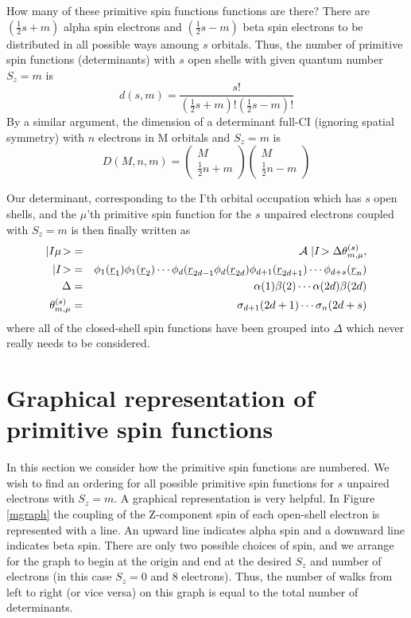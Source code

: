\documentclass[fullpage,12pt,fleqn]{article}
\newcommand{\RNold}[1]{\underline{r}_{#1}}
\newcommand{\nCr}[2]{\left(\begin{array}{c} #1 \\ #2 \end{array}\right)}
\newcommand{\half}{\frac{1}{2}}
\begin{document}
How many of these primitive spin functions functions are there?  There
are $(\half s + m)$ alpha spin electrons and $(\half s -
m)$ beta spin electrons to be distributed in all possible ways amoung
$s$ orbitals.  Thus, the number of primitive spin functions
(determinants) with $s$ open shells with given quantum number
$S_z=m$ is
\begin{equation}
d(s,m) = \frac{s!}{(\half s + m)! (\half s - m)!}
\end{equation}
By a similar argument, the dimension of a determinant full-CI
(ignoring spatial symmetry) with $n$ electrons in M orbitals and
$S_z=m$ is
\begin{equation}
D(M,n,m) = \nCr{M}{\half n + m}\nCr{M}{\half n - m}
\end{equation}

Our determinant, corresponding to the I'th orbital occupation which
has $s$ open shells, and the $\mu$'th primitive spin function for
the $s$ unpaired electrons coupled with $S_z=m$ is then finally
written as
\begin{eqnarray}
  |I\mu\! > & = & {\cal A} \; |I\! > \Delta \theta^{(s)}_{m,\mu} , \\
  |I\! > & = & \phi_{1}(\RNold{1})\phi_{1}(\RNold{2}) \cdots \phi_{d}(\RNold{2d-1}\phi_{d}(\RNold{2d})
\phi_{d+1}(\RNold{2d+1}) \cdots \phi_{d+s}(\RNold{n}) \\
  \Delta & = &\alpha(1)\beta(2) \cdots \alpha(2d) \beta(2d) \\
  \theta^{(s)}_{m,\mu} & = & \sigma_{d+1}(2d+1) \cdots
\sigma_{n}(2d+s)
\end{eqnarray}
where all of the closed-shell spin functions have been grouped into
$\Delta$ which never really needs to be considered.

\section{Graphical representation of primitive spin functions}

In this section we consider how the primitive spin functions are
numbered.  We wish to find an ordering for all possible primitive spin
functions for $s$ unpaired electrons with $S_z = m$.  A graphical
representation is very helpful.  In Figure \ref{mgraph} the coupling
of the Z-component spin of each open-shell electron is represented
with a line.  An upward line indicates alpha spin and a downward line
indicates beta spin.  There are only two possible choices of spin, and
we arrange for the graph to begin at the origin and end at the desired
$S_z$ and number of electrons (in this case $S_z = 0$ and 8
electrons).  Thus, the number of walks from left to right (or vice
versa) on this graph is equal to the total number of determinants.
\end{document}
